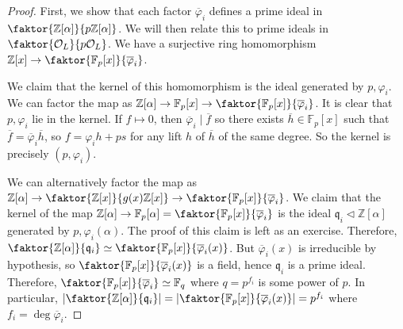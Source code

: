 \begin{proof}
    First, we show that each factor \( \overline\varphi_i \) defines a prime ideal in \( \faktor{\mathbb Z[\alpha]}{p\mathbb Z[\alpha]} \).
    We will then relate this to prime ideals in \( \faktor{\mathcal O_L}{p\mathcal O_L} \).
    We have a surjective ring homomorphism \( \mathbb Z[x] \to \faktor{\mathbb F_p[x]}{\overline \varphi_i} \).

    We claim that the kernel of this homomorphism is the ideal generated by \( p, \varphi_i \).
    We can factor the map as \( \mathbb Z[\alpha] \to \mathbb F_p[x] \to \faktor{\mathbb F_p[x]}{\overline \varphi_i} \).
    It is clear that \( p, \varphi_i \) lie in the kernel.
    If \( f \mapsto 0 \), then \( \overline \varphi_i \mid \overline f \) so there exists \( \overline h \in \mathbb F_p[x] \) such that \( \overline f = \overline \varphi_i \overline h \), so \( f = \varphi_i h + p s \) for any lift \( h \) of \( \overline h \) of the same degree.
    So the kernel is precisely \( (p, \varphi_i) \).

    We can alternatively factor the map as \( \mathbb Z[\alpha] \to \faktor{\mathbb Z[x]}{g(x) \mathbb Z[x]} \to \faktor{\mathbb F_p[x]}{\overline \varphi_i} \).
    We claim that the kernel of the map \( \mathbb Z[\alpha] \to \mathbb F_p[\alpha] = \faktor{\mathbb F_p[x]}{\overline \varphi_i} \) is the ideal \( \mathfrak q_i \triangleleft \mathbb Z[\alpha] \) generated by \( p, \varphi_i(\alpha) \).
    The proof of this claim is left as an exercise.
    Therefore, \( \faktor{\mathbb Z[\alpha]}{\mathfrak q_i} \simeq \faktor{\mathbb F_p[x]}{\overline \varphi_i(x)} \).
    But \( \overline \varphi_i(x) \) is irreducible by hypothesis, so \( \faktor{\mathbb F_p[x]}{\overline \varphi_i(x)} \) is a field, hence \( \mathfrak q_i \) is a prime ideal.
    Therefore, \( \faktor{\mathbb F_p[x]}{\overline\varphi_i} \simeq \mathbb F_q \) where \( q = p^{f_i} \) is some power of \( p \).
    In particular, \( \abs{\faktor{\mathbb Z[\alpha]}{\mathfrak q_i}} = \abs{\faktor{\mathbb F_p[x]}{\overline\varphi_i(x)}} = p^{f_i} \) where \( f_i = \deg \overline\varphi_i \).


\end{proof}
